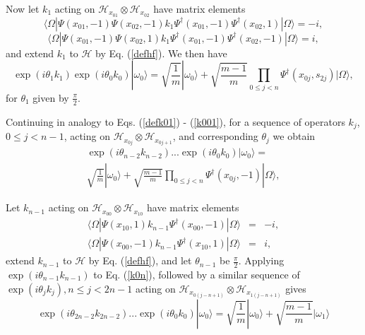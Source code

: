 \documentclass[12pt,amsmath,amssymb,onecolumn]{revtex4-2}
\begin{document}
Now let $k_{1}$ acting on $\mathcal{H}_{x_{01}} \otimes \mathcal{H}_{x_{02}}$
have matrix elements
\begin{equation}
\label{defk011}
 \langle  \Omega| \Psi( x_{01}, -1) \Psi( x_{02}, -1) k_1 
\Psi^{\dagger}(x_{01},-1) \Psi^{\dagger}( x_{02}, 1)|\Omega \rangle  = -i,
\end{equation}
\begin{equation}
\label{defk101}
 \langle  \Omega| \Psi(x_{01},-1) \Psi( x_{02}, 1) k_1
  \Psi^{\dagger}(x_{01},-1) \Psi^{\dagger}( x_{02},-1)|\Omega \rangle  = i,
\end{equation}
and extend $k_1$ to $\mathcal{H}$ by Eq. (\ref{defhf}).
We then have
\begin{equation}
\label{k001}
\exp( i \theta_1 k_1) \exp( i \theta_0 k_0)|\omega_0 \rangle  =
\sqrt{\frac{1}{m}} |\omega_0 \rangle  +
\sqrt{\frac{m - 1}{m}} \prod_{0 \le j < n} \Psi^{\dagger}( x_{0j}, s_{2j}) |\Omega \rangle ,
\end{equation}
for $\theta_1$ given by $\frac{\pi}{2}$.


Continuing in analogy to Eqs. (\ref{defk01}) - (\ref{k001}),
for a sequence of operators $k_j$, $0 \le j < n-1$, acting on
$\mathcal{H}_{x_{0j}} \otimes \mathcal{H}_{x_{0j+1}}$, and corresponding
$\theta_j$ we obtain
\begin{multline}
\label{k0n}
\exp( i \theta_{n-2} k_{n-2}) ... \exp( i \theta_0 k_0) |\omega_0 \rangle  = \\
\sqrt{\frac{1}{m}} |\omega_0 \rangle  +
\sqrt{\frac{m - 1}{m}} \prod_{0 \le j < n} \Psi^{\dagger}( x_{0j}, -1) |\Omega \rangle ,
\end{multline}

Let $k_{n-1}$ acting on $\mathcal{H}_{x_{00}} \otimes \mathcal{H}_{x_{10}}$
have matrix elements
\begin{subequations}
\begin{eqnarray}
\label{defknm1}
 \langle  \Omega| \Psi( x_{10}, 1) k_{n-1}  \Psi^{\dagger}(x_{00},-1)|\Omega \rangle  &=& -i, \\
\label{defknm11}
 \langle  \Omega| \Psi(x_{00},-1)  k_{n-1} \Psi^{\dagger}( x_{10},1)|\Omega \rangle  &=& i,
\end{eqnarray}
\end{subequations}
extend $k_{n-1}$ to $\mathcal{H}$ by Eq. (\ref{defhf}),
and let $\theta_{n-1}$ be $\frac{\pi}{2}$.
Applying $\exp(i \theta_{n-1} k_{n-1})$ to Eq. (\ref{k0n}),
followed by a similar sequence of $\exp(i \theta_j k_j), n \le j < 2n -1$ acting on
$\mathcal{H}_{x_{0(j-n+1)}} \otimes \mathcal{H}_{x_{1(j-n+1)}}$ gives
\begin{equation}
\label{k02n}
\exp( i \theta_{2n-2} k_{2n-2}) ... \exp( i \theta_0 k_0) |\omega_0 \rangle  =
\sqrt{\frac{1}{m}} |\omega_0 \rangle  +
\sqrt{\frac{m - 1}{m}} |\omega_1 \rangle 
\end{equation}
\end{document}
